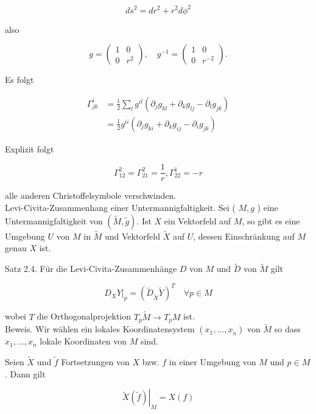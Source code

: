 \documentclass[10pt]{article}
\begin{document}
$$
d s^{2}=d r^{2}+r^{2} d \phi^{2}
$$

also

$$
g=\left(\begin{array}{cc}
1 & 0 \\
0 & r^{2}
\end{array}\right), \quad g^{-1}=\left(\begin{array}{cc}
1 & 0 \\
0 & r^{-2}
\end{array}\right) .
$$

Es folgt

$$
\begin{aligned}
\Gamma_{j k}^{i} & =\frac{1}{2} \sum_{l} g^{i l}\left(\partial_{j} g_{k l}+\partial_{k} g_{l j}-\partial_{l} g_{j k}\right) \\
& =\frac{1}{2} g^{i i}\left(\partial_{j} g_{k i}+\partial_{k} g_{i j}-\partial_{i} g_{j k}\right)
\end{aligned}
$$

Explizit folgt

$$
\Gamma_{12}^{2}=\Gamma_{21}^{2}=\frac{1}{r}, \Gamma_{22}^{1}=-r
$$

alle anderen Christoffelsymbole verschwinden.\\
Levi-Civita-Zusammenhang einer Untermannigfaltigkeit. Sei ( $M, g$ ) eine Untermannigfaltigkeit von $(\tilde{M}, \tilde{g})$. Ist $X$ ein Vektorfeld auf $M$, so gibt es eine Umgebung $U$ von $M$ in $\tilde{M}$ und Vektorfeld $\tilde{X}$ auf $U$, dessen Einschränkung auf $M$ genau $X$ ist.

Satz 2.4. Für die Levi-Civita-Zusammenhänge $D$ von $M$ und $\tilde{D}$ von $\tilde{M}$ gilt


\begin{equation*}
\left.D_{X} Y\right|_{p}=\left(\tilde{D}_{\tilde{X}} \tilde{Y}\right)^{T} \quad \forall p \in M \tag{1}
\end{equation*}


wobei $T$ die Orthogonalprojektion $T_{p} \tilde{M} \rightarrow T_{p} M$ ist.\\
Beweis. Wir wählen ein lokales Koordinatensystem $\left(x_{1}, \ldots, x_{\tilde{n}}\right)$ von $\tilde{M}$ so dass $x_{1}, \ldots, x_{n}$ lokale Koordinaten von $M$ sind.

Seien $\tilde{X}$ und $\tilde{f}$ Fortsetzungen von $X$ bzw. $f$ in einer Umgebung von $M$ und $p \in M$. Dann gilt


\begin{equation*}
\left.\tilde{X}(\tilde{f})\right|_{M}=X(f) \tag{2}
\end{equation*}
\end{document}
